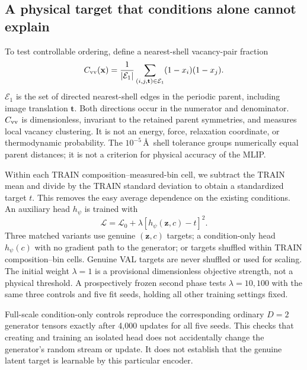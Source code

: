 \documentclass[11pt]{article}
\begin{document}
\subsection{A physical target that conditions alone cannot explain}
To test controllable ordering, define a nearest-shell vacancy-pair fraction
\begin{equation}
C_{\rm vv}(\mathbf x)=\frac{1}{|\mathcal E_1|}
\sum_{(i,j,\mathbf t)\in\mathcal E_1}(1-x_i)(1-x_j).
\end{equation}
$\mathcal E_1$ is the set of directed nearest-shell edges in the periodic
parent, including image translation $\mathbf t$. Both directions occur in
the numerator and denominator. $C_{\rm vv}$ is dimensionless, invariant to
the retained parent symmetries, and measures local vacancy clustering. It is
not an energy, force, relaxation coordinate, or thermodynamic probability.
The $10^{-5}$\,\AA\ shell tolerance groups numerically equal parent distances;
it is not a criterion for physical accuracy of the MLIP.

Within each TRAIN composition--measured-bin cell, we subtract the TRAIN mean
and divide by the TRAIN standard deviation to obtain a standardized target
$t$. This removes the easy average dependence on the existing conditions.
An auxiliary head $h_\psi$ is trained with
\begin{equation}
\mathcal L=\mathcal L_0+\lambda[h_\psi(\mathbf z,c)-t]^2.
\end{equation}
Three matched variants use genuine $(\mathbf z,c)$ targets; a condition-only
head $h_\psi(c)$ with no gradient path to the generator; or targets shuffled
within TRAIN composition--bin cells. Genuine VAL targets are never shuffled
or used for scaling. The initial weight $\lambda=1$ is a provisional
dimensionless objective strength, not a physical threshold. A prospectively
frozen second phase tests $\lambda=10,100$ with the same three controls and
five fit seeds, holding all other training settings fixed.

Full-scale condition-only controls reproduce the corresponding ordinary
$D=2$ generator tensors exactly after 4,000 updates for all five seeds. This
checks that creating and training an isolated head does not accidentally
change the generator's random stream or update. It does not establish that
the genuine latent target is learnable by this particular encoder.
\end{document}

